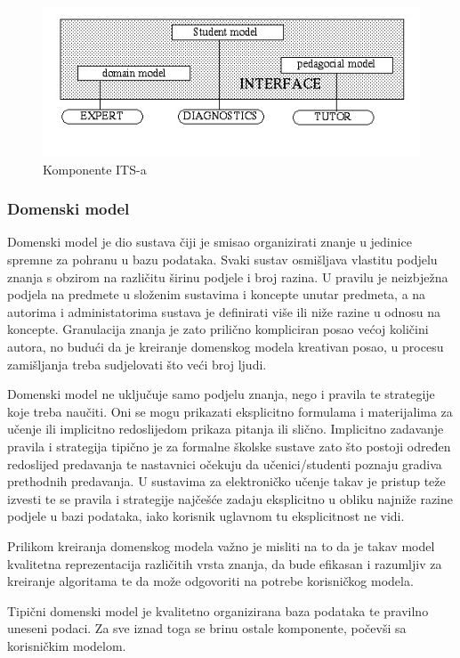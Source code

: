 \documentclass[times, utf8, zavrsni]{fer}
\begin{document}
\begin{figure}[htb]
	\centering
	\includegraphics[]{img/ITS-components.jpg}
	\caption{Komponente ITS-a}
	\label{fig:its-comp}
\end{figure}

\subsubsection{Domenski model}
Domenski model je dio sustava čiji je smisao organizirati znanje u jedinice spremne za pohranu u bazu podataka. Svaki sustav osmišljava vlastitu podjelu znanja s obzirom na različitu širinu podjele i broj razina. U pravilu je neizbježna podjela na predmete u složenim sustavima i koncepte unutar predmeta, a na autorima i administatorima sustava je definirati više ili niže razine u odnosu na koncepte. Granulacija znanja je zato prilično kompliciran posao većoj količini autora, no budući da je kreiranje domenskog modela kreativan posao, u procesu zamišljanja treba sudjelovati što veći broj ljudi.
\par
Domenski model ne uključuje samo podjelu znanja, nego i pravila te strategije koje treba naučiti. Oni se mogu prikazati eksplicitno formulama i materijalima za učenje ili implicitno redoslijedom prikaza pitanja ili slično. Implicitno zadavanje pravila i strategija tipično je za formalne školske sustave zato što postoji određen redoslijed predavanja te nastavnici očekuju da učenici/studenti poznaju gradiva prethodnih predavanja. U sustavima za elektroničko učenje takav je pristup teže izvesti te se pravila i strategije najčešće zadaju eksplicitno u obliku najniže razine podjele u bazi podataka, iako korisnik uglavnom tu eksplicitnost ne vidi.
\par
Prilikom kreiranja domenskog modela važno je misliti na to da je takav model kvalitetna reprezentacija različitih vrsta znanja, da bude efikasan i razumljiv za kreiranje algoritama te da može odgovoriti na potrebe korisničkog modela.
\par
Tipični domenski model je kvalitetno organizirana baza podataka te pravilno uneseni podaci. Za sve iznad toga se brinu ostale komponente, počevši sa korisničkim modelom.
\end{document}
